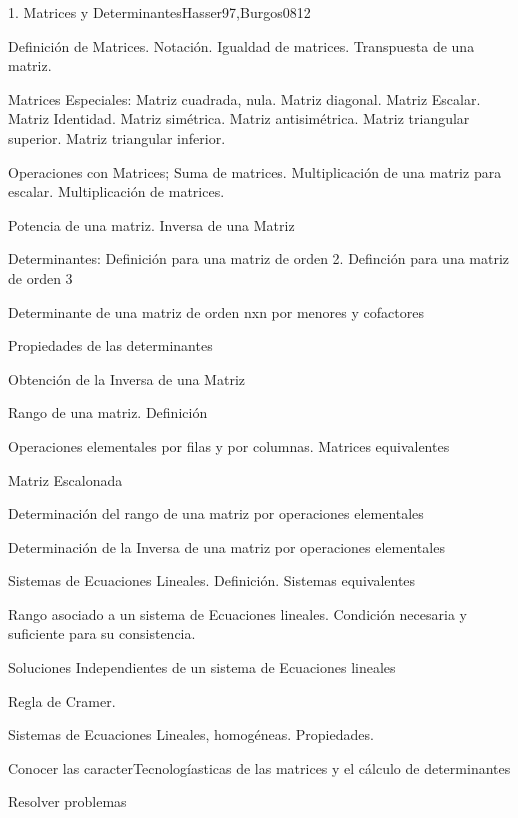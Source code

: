 \begin{syllabus}
\begin{unit}{1. Matrices y Determinantes}{Hasser97,Burgos08}{12}
\begin{topics}
      \item Definición de Matrices. Notación. Igualdad de matrices. Transpuesta de una matriz.
      \item Matrices Especiales: Matriz cuadrada, nula. Matriz diagonal. Matriz  Escalar. Matriz Identidad. Matriz simétrica. Matriz antisimétrica. Matriz  triangular superior. Matriz triangular inferior.
      \item Operaciones con Matrices; Suma de matrices. Multiplicación de una matriz para escalar. Multiplicación de matrices.
	\item Potencia de una matriz. Inversa de una Matriz
	\item Determinantes: Definición para una matriz de orden 2. Definción para una matriz de orden 3
	\item Determinante de una matriz de orden nxn por menores y cofactores
	\item Propiedades de las determinantes
	\item Obtención de la Inversa de una Matriz
	\item Rango de una matriz. Definición
	\item Operaciones elementales por filas y por columnas. Matrices equivalentes
	\item Matriz Escalonada
	\item Determinación del rango de una matriz por operaciones elementales
	\item Determinación de la Inversa de una matriz por operaciones elementales
	\item Sistemas de Ecuaciones Lineales. Definición. Sistemas equivalentes
	\item Rango asociado a un sistema de Ecuaciones lineales. Condición necesaria y suficiente para su consistencia.
	\item Soluciones Independientes de un sistema de Ecuaciones lineales
	\item Regla de Cramer.
	\item Sistemas de Ecuaciones Lineales, homogéneas. Propiedades.
   \end{topics}

   \begin{unitgoals}
      \item Conocer las caracterTecnologíasticas de las matrices y el cálculo de determinantes
	\item Resolver problemas
   \end{unitgoals}
\end{unit}


\end{syllabus}
